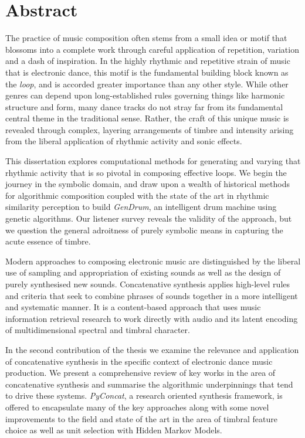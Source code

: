 
\chapter{Abstract}

The practice of music composition often stems from a small idea or motif that blossoms into a complete work through careful application of repetition, variation and a dash of inspiration. In the highly rhythmic and repetitive strain of music that is electronic dance, this motif is the fundamental building block known as the \textit{loop}, and is accorded greater importance than any other style. While other genres can depend upon long-established rules governing things like harmonic structure and form, many dance tracks do not stray far from its fundamental central theme in the traditional sense. Rather, the craft of this unique music is revealed through complex, layering arrangements of timbre and intensity arising from the liberal application of rhythmic activity and sonic effects.

This dissertation explores computational methods for generating and varying that rhythmic activity that is so pivotal in composing effective loops. We begin the journey in the symbolic domain, and draw upon a wealth of historical methods for algorithmic composition coupled with the state of the art in rhythmic similarity perception to build \textit{GenDrum}, an intelligent drum machine using genetic algorithms. Our listener survey reveals the validity of the approach, but we question the general adroitness of purely symbolic means in capturing the acute essence of timbre.

Modern approaches to composing electronic music are distinguished by the liberal use of sampling and appropriation of existing sounds as well as the design of purely synthesised new sounds. Concatenative synthesis applies high-level rules and criteria that seek to combine phrases of sounds together in a more intelligent and systematic manner. It is a content-based approach that uses music information retrieval research to work directly with audio and its latent encoding of multidimensional spectral and timbral character.

In the second contribution of the thesis we examine the relevance and application of concatenative synthesis in the specific context of electronic dance music production. We present a comprehensive review of key works in the area of concatenative synthesis and summarise the algorithmic underpinnings that tend to drive these systems. \textit{PyConcat}, a research oriented synthesis framework, is offered to encapsulate many of the key approaches along with some novel improvements to the field and state of the art in the area of timbral feature choice as well as unit selection with Hidden Markov Models.

